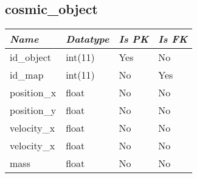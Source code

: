 \subsection{cosmic\_object}

\begin{table}[h!]
\centering
\small

    \begin{tabular}{ | m{} | m{} | m{} | m{} | }
    \hline
        \cellcolor{blue!25}\textbf{\textit{Name}} &

        \cellcolor{blue!25}\textbf{\textit{Datatype}} &
        \cellcolor{blue!25}\textbf{\textit{Is PK}} &
        \cellcolor{blue!25}\textbf{\textit{Is FK}} \\
    \hline
    \hline
        id\_object & int(11) & Yes & No \\
    \hline
        id\_map & int(11) & No & Yes \\
    \hline
        position\_x & float & No & No \\
    \hline
        position\_y & float & No & No \\
    \hline
        velocity\_x & float & No & No \\
    \hline
        velocity\_x & float & No & No \\
    \hline
        mass & float & No & No \\
    \hline
    \end{tabular}

\end{table}

